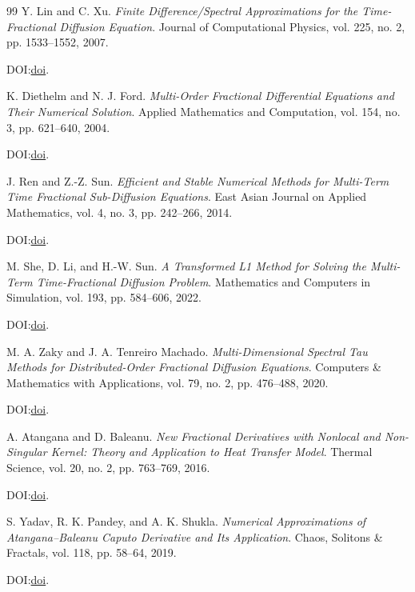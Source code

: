 \documentclass[11pt]{article}
\begin{document}
\begin{thebibliography}{99}
Y. Lin and C. Xu.
\emph{Finite Difference/Spectral Approximations for the Time-Fractional Diffusion Equation}.
Journal of Computational Physics, vol. 225, no. 2, pp. 1533--1552, 2007.
\par\noindent DOI:\@ \href{https://doi.org/10.1016/j.jcp.2007.02.001}{doi}.

K. Diethelm and N. J. Ford.
\emph{Multi-Order Fractional Differential Equations and Their Numerical Solution}.
Applied Mathematics and Computation, vol. 154, no. 3, pp. 621--640, 2004.
\par\noindent DOI:\@ \href{https://doi.org/10.1016/S0096-3003(03)00739-2}{doi}.

J. Ren and Z.-Z. Sun.
\emph{Efficient and Stable Numerical Methods for Multi-Term Time Fractional Sub-Diffusion Equations}.
East Asian Journal on Applied Mathematics, vol. 4, no. 3, pp. 242--266, 2014.
\par\noindent DOI:\@ \href{https://doi.org/10.4208/EAJAM.181113.280514A}{doi}.

M. She, D. Li, and H.-W. Sun.
\emph{A Transformed L1 Method for Solving the Multi-Term Time-Fractional Diffusion Problem}.
Mathematics and Computers in Simulation, vol. 193, pp. 584--606, 2022.
\par\noindent DOI:\@ \href{https://doi.org/10.1016/j.matcom.2021.11.005}{doi}.

M. A. Zaky and J. A. Tenreiro Machado.
\emph{Multi-Dimensional Spectral Tau Methods for Distributed-Order Fractional Diffusion Equations}.
Computers \& Mathematics with Applications, vol. 79, no. 2, pp. 476--488, 2020.
\par\noindent DOI:\@ \href{https://doi.org/10.1016/j.camwa.2019.07.008}{doi}.

A. Atangana and D. Baleanu.
\emph{New Fractional Derivatives with Nonlocal and Non-Singular Kernel: Theory and Application to Heat Transfer Model}.
Thermal Science, vol. 20, no. 2, pp. 763--769, 2016.
\par\noindent DOI:\@ \href{https://doi.org/10.2298/TSCI160111018A}{doi}.

S. Yadav, R. K. Pandey, and A. K. Shukla.
\emph{Numerical Approximations of Atangana--Baleanu Caputo Derivative and Its Application}.
Chaos, Solitons \& Fractals, vol. 118, pp. 58--64, 2019.
\par\noindent DOI:\@ \href{https://doi.org/10.1016/j.chaos.2018.11.009}{doi}.


\end{thebibliography}
\end{document}
